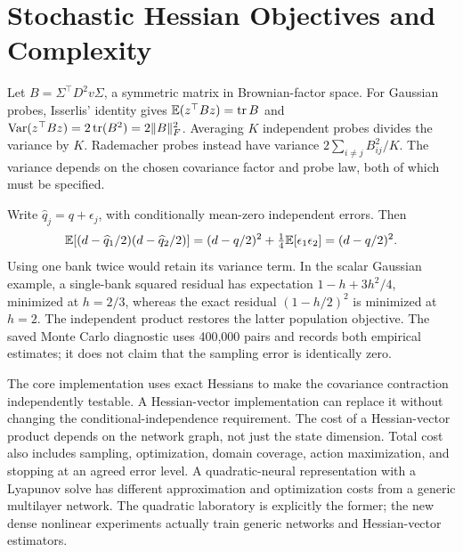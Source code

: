\section{Stochastic Hessian Objectives and Complexity}
Let $B=\Sigma^\top D^2v\Sigma$, a symmetric matrix in Brownian-factor space. For Gaussian probes, Isserlis' identity gives $\mathbb E(z^\top Bz)=\operatorname{tr} B$ and $\operatorname{Var}(z^\top Bz)=2\operatorname{tr}(B^2)=2\|B\|_F^2$. Averaging $K$ independent probes divides the variance by $K$. Rademacher probes instead have variance $2\sum_{i\ne j}B_{ij}^2/K$. The variance depends on the chosen covariance factor and probe law, both of which must be specified.

Write $\widehat q_j=q+\epsilon_j$, with conditionally mean-zero independent errors. Then
\[
 \mathbb E[(d-\widehat q_1/2)(d-\widehat q_2/2)]
 =(d-q/2)^2+\tfrac14\mathbb E[\epsilon_1\epsilon_2]=(d-q/2)^2.
\]
Using one bank twice would retain its variance term. In the scalar Gaussian example, a single-bank squared residual has expectation $1-h+3h^2/4$, minimized at $h=2/3$, whereas the exact residual $(1-h/2)^2$ is minimized at $h=2$. The independent product restores the latter population objective. The saved Monte Carlo diagnostic uses 400,000 pairs and records both empirical estimates; it does not claim that the sampling error is identically zero.

The core implementation uses exact Hessians to make the covariance contraction independently testable. A Hessian-vector implementation can replace it without changing the conditional-independence requirement. The cost of a Hessian-vector product depends on the network graph, not just the state dimension. Total cost also includes sampling, optimization, domain coverage, action maximization, and stopping at an agreed error level. A quadratic-neural representation with a Lyapunov solve has different approximation and optimization costs from a generic multilayer network. The quadratic laboratory is explicitly the former; the new dense nonlinear experiments actually train generic networks and Hessian-vector estimators.


